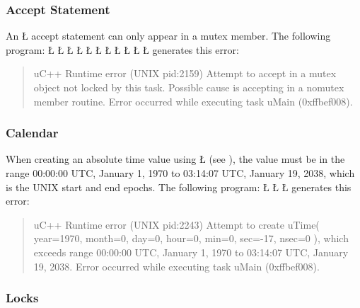 \documentclass[openright,twoside]{report}
\begin{document}
\subsubsection{Accept Statement}

An \LGinlinetrue\LGbegin\lgrinde\L{}\endlgrinde\LGend{} accept statement can only appear in a mutex member.
The following program:
\LGinlinefalse\LGbegin\lgrinde
\L{}
\L{}
\L{\LB{}}
\L{\LB{}}
\L{\LB{}}
\CE{}\L{\LB{}}
\L{\LB{\};}}
\L{}
\L{\LB{}}
\L{\LB{}}
\L{\LB{\}}}
\endlgrinde\LGend
generates this error:
\begin{quote}
\BGfont
uC++ Runtime error (UNIX pid:2159) Attempt to accept in a mutex object not locked by this task.
Possible cause is accepting in a nomutex member routine.
Error occurred while executing task uMain (0xffbef008).
\end{quote}


\subsubsection{Calendar}

When creating an absolute time value using \LGinlinetrue\LGbegin\lgrinde\L{}\endlgrinde\LGend{} (see ), the value must be in the range 00:00:00 UTC, January 1, 1970 to 03:14:07 UTC, January 19, 2038, which is the UNIX start and end epochs.
The following program:
\LGinlinefalse\LGbegin\lgrinde
\L{}
\L{\LB{}}
\L{\LB{\}}}
\endlgrinde\LGend
generates this error:
\begin{quote}
\BGfont
uC++ Runtime error (UNIX pid:2243) Attempt to create uTime( year=1970, month=0, day=0, hour=0, min=0, sec=-17, nsec=0 ), which exceeds range 00:00:00 UTC, January 1, 1970 to 03:14:07 UTC, January 19, 2038.
Error occurred while executing task uMain (0xffbef008).
\end{quote}


\subsubsection{Locks}
\end{document}
